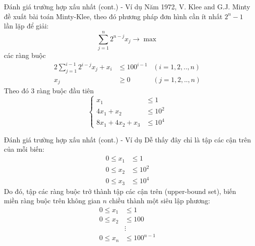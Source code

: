 \documentclass[10pt]{beamer}
\begin{document}
\begin{frame}{Đánh giá trường hợp xấu nhất (cont.) - Ví dụ}
Năm 1972, V. Klee and G.J. Minty\cite{klee1970good} đề xuất bài toán Minty-Klee, theo đó phương pháp đơn hình cần ít nhất $2^n - 1$ lần lặp để giải:
\begin{equation*}
\sum_{j = 1}^{n} 2^{n - j} x_j \rightarrow \max
\end{equation*}
các ràng buộc
\begin{equation*}
\begin{aligned}
2\sum_{j = 1}^{i - 1} 2^{i - j}x_j + x_i &\leq 100^{i - 1} & (i = 1, 2, .., n)\\
x_j &\geq 0 & (j = 1, 2, .., n)
\end{aligned}
\end{equation*}
Theo đó 3 ràng buộc đầu tiên
$$
\left\{
\begin{array}{lll}
x_1 &\leq 1\\
4x_1 + x_2 &\leq 10^2\\
8x_1 + 4x_2 + x_3 &\leq 10^4
\end{array}
\right.
$$
\end{frame}

\begin{frame}{Đánh giá trường hợp xấu nhất (cont.) - Ví dụ}
Dễ thấy đây chỉ là tập các cận trên của mỗi biến:
$$
\begin{array}{lll}
0 \leq x_1 &\leq 1\\
0 \leq x_2 &\leq 10^2\\
0 \leq x_3 &\leq 10^4
\end{array}
$$
Do đó, tập các ràng buộc trở thành tập các cận trên (upper-bound set), biến miền ràng buộc trên không gian $n$ chiều thành một siêu lập phương:
$$
\begin{array}{lll}
0 \leq x_1 &\leq 1\\
0 \leq x_2 &\leq 100\\
&\vdots\\
0 \leq x_n &\leq 100^{n - 1}
\end{array}
$$
\end{frame}
\end{document}
